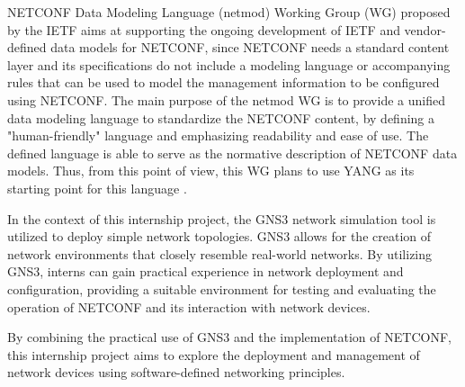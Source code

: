 \gls{NETCONF} Data Modeling Language (\gls{netmod}) Working Group (WG) proposed by the \gls{IETF} aims at supporting the ongoing development of IETF and vendor-defined data models for \gls{NETCONF}, since \gls{NETCONF} needs a standard content layer and its specifications do not include a modeling language or accompanying rules that can be used to model the management information to be configured using \gls{NETCONF}. The main purpose of the \gls{netmod} WG is to provide a unified data modeling language to standardize the \gls{NETCONF} content, by defining a "human-friendly" language and emphasizing readability and ease of use. The defined language is able to serve as the normative description of \gls{NETCONF} data models. Thus, from this point of view, this WG plans to use \gls{YANG} as its starting point for this language \cite{netconf1}.

In the context of this internship project, the \gls{GNS3} network simulation tool is utilized to deploy simple network topologies. \gls{GNS3} allows for the creation of network environments that closely resemble real-world networks. By utilizing \gls{GNS3}, interns can gain practical experience in network deployment and configuration, providing a suitable environment for testing and evaluating the operation of \gls{NETCONF} and its interaction with network devices.

By combining the practical use of \gls{GNS3} and the implementation of \gls{NETCONF}, this internship project aims to explore the deployment and management of network devices using software-defined networking principles.
